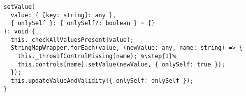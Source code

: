 \begin{verbatim}
  setValue(
    value: { [key: string]: any },
    { onlySelf }: { onlySelf?: boolean } = {}
  ): void {
    this._checkAllValuesPresent(value);
    StringMapWrapper.forEach(value, (newValue: any, name: string) => {
      this._throwIfControlMissing(name); %\step{1}%
      this.controls[name].setValue(newValue, { onlySelf: true });
    });
    this.updateValueAndValidity({ onlySelf: onlySelf });
  }
\end{verbatim}
